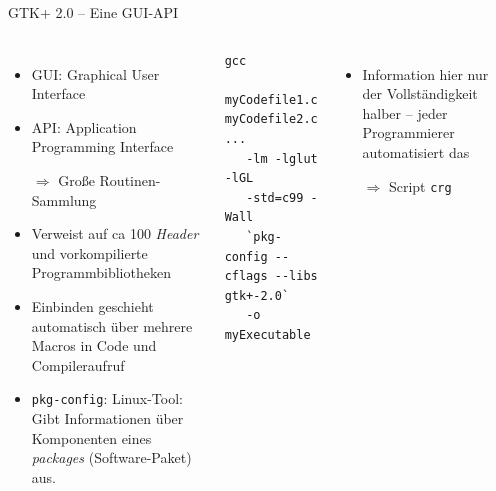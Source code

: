 \begin{frame}[fragile]{GTK+ 2.0 -- Eine GUI-API}
%
\begin{columns}[T]
\begin{itemize}
\item GUI: Graphical User Interface
\item API: Application Programming Interface
\item[$\Rightarrow$] Große Routinen-Sammlung
\item Verweist auf ca 100 \emph{Header} und vorkompilierte Programmbibliotheken
\item Einbinden geschieht automatisch über mehrere Macros in Code und Compileraufruf
\item \texttt{pkg-config}: Linux-Tool: Gibt Informationen über Komponenten eines \emph{packages} (Software-Paket) aus.
\end{itemize}
%
\begin{codebox}
\begin{verbatim}
gcc 
   myCodefile1.c myCodefile2.c ...
   -lm -lglut -lGL
   -std=c99 -Wall 
   `pkg-config --cflags --libs gtk+-2.0`
   -o myExecutable
\end{verbatim}
\end{codebox}
%
\begin{itemize}
\item Information hier nur der Vollständigkeit halber -- jeder Programmierer automatisiert das
\item[$\Rightarrow$] Script \texttt{crg}
\end{itemize}
\end{columns}
%
\end{frame}


